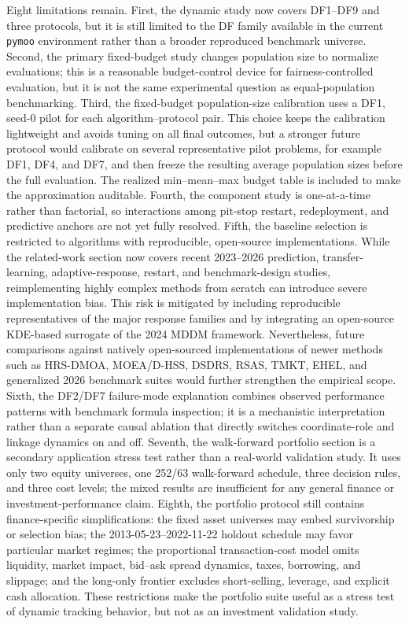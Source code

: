 \documentclass[preprint,12pt]{elsarticle}
\begin{document}
Eight limitations remain. First, the dynamic study now covers DF1--DF9 and three protocols, but it is still limited to the DF family available in the current \texttt{pymoo} environment rather than a broader reproduced benchmark universe. Second, the primary fixed-budget study changes population size to normalize evaluations; this is a reasonable budget-control device for fairness-controlled evaluation, but it is not the same experimental question as equal-population benchmarking. Third, the fixed-budget population-size calibration uses a DF1, seed-0 pilot for each algorithm--protocol pair. This choice keeps the calibration lightweight and avoids tuning on all final outcomes, but a stronger future protocol would calibrate on several representative pilot problems, for example DF1, DF4, and DF7, and then freeze the resulting average population sizes before the full evaluation. The realized min--mean--max budget table is included to make the approximation auditable. Fourth, the component study is one-at-a-time rather than factorial, so interactions among pit-stop restart, redeployment, and predictive anchors are not yet fully resolved. Fifth, the baseline selection is restricted to algorithms with reproducible, open-source implementations. While the related-work section now covers recent 2023--2026 prediction, transfer-learning, adaptive-response, restart, and benchmark-design studies, reimplementing highly complex methods from scratch can introduce severe implementation bias. This risk is mitigated by including reproducible representatives of the major response families and by integrating an open-source KDE-based surrogate of the 2024 MDDM framework. Nevertheless, future comparisons against natively open-sourced implementations of newer methods such as HRS-DMOA, MOEA/D-HSS, DSDRS, RSAS, TMKT, EHEL, and generalized 2026 benchmark suites would further strengthen the empirical scope. Sixth, the DF2/DF7 failure-mode explanation combines observed performance patterns with benchmark formula inspection; it is a mechanistic interpretation rather than a separate causal ablation that directly switches coordinate-role and linkage dynamics on and off. Seventh, the walk-forward portfolio section is a secondary application stress test rather than a real-world validation study. It uses only two equity universes, one 252/63 walk-forward schedule, three decision rules, and three cost levels; the mixed results are insufficient for any general finance or investment-performance claim. Eighth, the portfolio protocol still contains finance-specific simplifications: the fixed asset universes may embed survivorship or selection bias; the 2013-05-23--2022-11-22 holdout schedule may favor particular market regimes; the proportional transaction-cost model omits liquidity, market impact, bid--ask spread dynamics, taxes, borrowing, and slippage; and the long-only frontier excludes short-selling, leverage, and explicit cash allocation. These restrictions make the portfolio suite useful as a stress test of dynamic tracking behavior, but not as an investment validation study.
\end{document}
